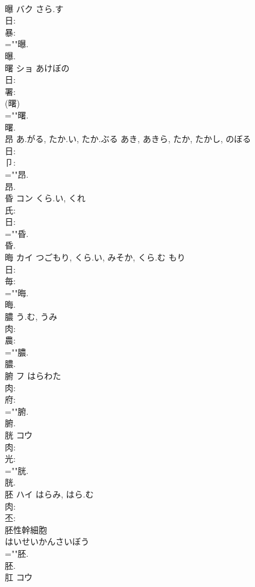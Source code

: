 \documentclass[8pt]{extreport}
\begin{document}
\begin{CJK}{UTF8}{min}
\\	曝	バク	さら.す		
\\	日: 
\\	暴: 
\\	=""曝.
\\	曝.
\\	曙	ショ	あけぼの		
\\	日: 
\\	署: 
\\	(曙) 
\\	=""曙.
\\	曙.
\\	昂		あ.がる, たか.い, たか.ぶる	あき, あきら, たか, たかし, のぼる			
\\	日: 
\\	卩: 
\\	=""昂.
\\	昂.
\\	昏	コン	くら.い, くれ		
\\	氏: 
\\	日: 
\\	=""昏.
\\	昏.
\\	晦	カイ	つごもり, くら.い, みそか, くら.む	もり	
\\	日: 
\\	毎: 
\\	=""晦.
\\	晦.
\\	膿		う.む, うみ				
\\	肉: 
\\	農: 
\\	=""膿.
\\	膿.
\\	腑	フ	はらわた		
\\	肉: 
\\	府: 
\\	=""腑.
\\	腑.
\\	胱	コウ			
\\	肉: 
\\	光: 
\\	=""胱.
\\	胱.
\\	胚	ハイ	はらみ, はら.む		
\\	肉: 
\\	丕: 
\\	胚性幹細胞　
\\	はいせいかんさいぼう　
\\	=""胚.
\\	胚.
\\	肛	コウ			

\end{CJK}
\end{document}
